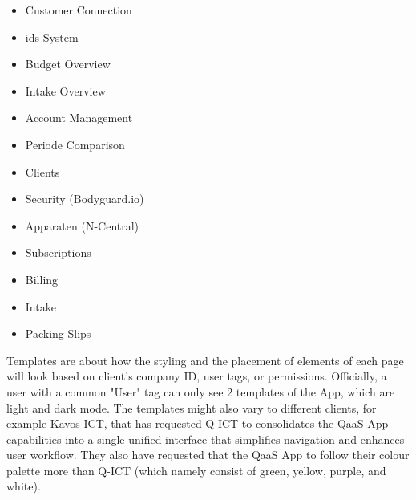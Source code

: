 \begin{itemize}
      \item Customer Connection
      \item \acrshort{ids} System
      \item Budget Overview
      \item Intake Overview
      \item Account Management
      \item Periode Comparison
      \item Clients
      \item Security (Bodyguard.io)
      \item Apparaten (N-Central)
      \item Subscriptions
      \item Billing
      \item Intake
      \item Packing Slips
\end{itemize}

Templates are about how the styling and the placement of elements of each page will look based on client's company ID, user tags, or permissions.
Officially, a user with a common "User" tag can only see 2 templates of the App, which are light and dark mode. The templates might also vary
to different clients, for example Kavos ICT, that has requested Q-ICT to consolidates the QaaS App capabilities into a single unified interface
that simplifies navigation and enhances user workflow. They also have requested that the QaaS App to follow their colour palette more than Q-ICT
(which namely consist of green, yellow, purple, and white).



